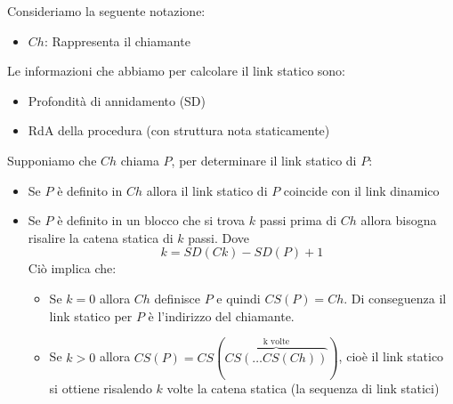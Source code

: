 \documentclass[a4paper]{article}
\begin{document}
\vspace{1em}
\noindent
Consideriamo la seguente notazione:
\begin{itemize}
  \item \( Ch \): Rappresenta il chiamante
\end{itemize}
Le informazioni che abbiamo per calcolare il link statico sono:
\begin{itemize}
  \item Profondità di annidamento (SD)
  \item RdA della procedura (con struttura nota staticamente)
\end{itemize}
Supponiamo che \( Ch \) chiama \( P \), per determinare il link statico di \( P \):
\begin{itemize}
  \item Se \( P \) è definito in \( Ch \) allora il link statico di \( P \) coincide
    con il link dinamico
  \item Se \( P \) è definito in un blocco che si trova \( k \) passi prima di \( Ch \) 
    allora bisogna risalire la catena statica di \( k \) passi. Dove 
    \[
      k = SD(Ck) - SD(P) + 1
    \] 
    Ciò implica che:
    \begin{itemize}
      \item Se \( k = 0 \) allora \( Ch \) definisce \( P \) e quindi
        \( CS(P) = Ch \). Di conseguenza il link statico per \( P \) è l'indirizzo del
        chiamante.

      \item Se \( k > 0 \) allora \( CS(P) = CS(\overbrace{CS(\ldots CS(Ch))}^{\text{k volte}}) \),
        cioè il link statico si ottiene risalendo \( k \) volte la catena statica
        (la sequenza di link statici)
    \end{itemize}
\end{itemize}
\end{document}
